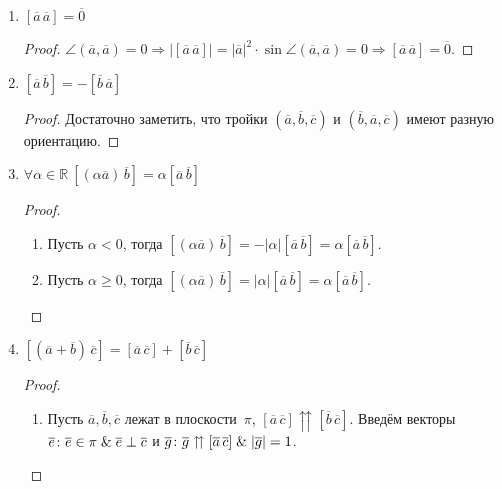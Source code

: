 \begin{enumerate}
	\item $[\overline a\,\overline a] = \overline 0$
	\begin{proof}
	$\angle(\overline a, \overline a) = 0 \Rightarrow
	|[\overline a\,\overline a]| = |\overline a|^2 \cdot \sin \angle(\overline a, \overline a) = 0 \Rightarrow
	[\overline a\,\overline a] = \overline 0$.
	\end{proof}
	
	\item $[\overline a\,\overline b] = -[\overline b\,\overline a]$
	\begin{proof}
	Достаточно заметить, что тройки $(\overline a, \overline b, \overline c)$ и $(\overline b, \overline a, \overline c)$ имеют разную ориентацию.
	\end{proof}
	
	\item $\forall \alpha \in \mathbb R \ [(\alpha \overline a)\,\overline b] = \alpha [\overline a\,\overline b]$
	\begin{proof}
	\begin{enumerate}
		\item Пусть $\alpha < 0$, тогда $[(\alpha \overline a)\,\overline b] = -|\alpha| [\overline a\,\overline b] = \alpha [\overline a\,\overline b]$.
		\item Пусть $\alpha \geqslant 0$, тогда $[(\alpha \overline a)\,\overline b] = |\alpha| [\overline a\,\overline b] = \alpha [\overline a\,\overline b]$.
	\end{enumerate}
	\end{proof}
	
	\item $[(\overline a + \overline b)\,\overline c] = [\overline a\,\overline c] + [\overline b\,\overline c]$
	\begin{proof}
	\begin{enumerate}
		\item \begin{minipage}[t]{130mm}\noindent
		Пусть $\overline a, \overline b, \overline c$ лежат в плоскости~$\pi$, $[\overline a\,\overline c] \upuparrows [\overline b\,\overline c]$.
		Введём векторы $\overline e \colon \overline e \in \pi \mathrel{\&} \overline e \perp \overline c$ и $\overline g \colon \overline g \upuparrows [\overline a\,\overline c] \opbr\lAnd |\overline g| = 1$.
		

\end{minipage}
\end{enumerate}
\end{proof}
\end{enumerate}
